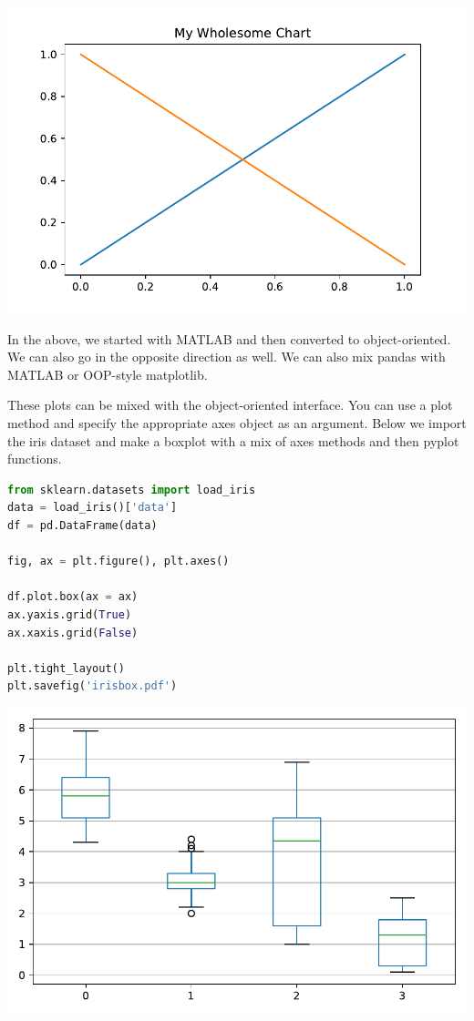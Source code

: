 \begin{center}
    \includegraphics[width = .8\textwidth]{proseplots/chart.pdf}
\end{center}


In the above, we started with MATLAB and then converted to object-oriented. We can also go in the opposite direction as well. We can also mix pandas with MATLAB or OOP-style matplotlib. 

These plots can be mixed with the object-oriented interface. You can use a plot method and specify the appropriate axes object as an argument. Below we import the iris dataset and make a boxplot with a mix of axes methods and then pyplot functions. 

\begin{lstlisting}[language = Python, caption= {[irisbox.py]}]
from sklearn.datasets import load_iris 
data = load_iris()['data']
df = pd.DataFrame(data)

fig, ax = plt.figure(), plt.axes()

df.plot.box(ax = ax)
ax.yaxis.grid(True)
ax.xaxis.grid(False)

plt.tight_layout()
plt.savefig('irisbox.pdf')
\end{lstlisting}

\begin{center}
    \includegraphics[width = .7\textwidth]{proseplots/irisbox.pdf}
\end{center}



